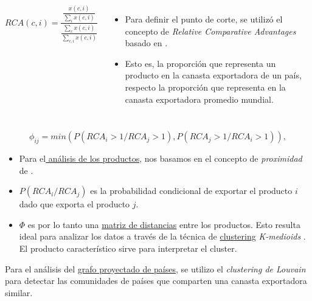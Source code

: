 \documentclass[compress]{beamer}
\begin{document}
\begin{frame}

\begin{columns}[c] 

$$
RCA(c,i)= \frac{\displaystyle \frac{x(c,i)}{\displaystyle \sum_{i}x(c,i)}}{\frac{\displaystyle\sum_{c}x(c,i)}{\displaystyle \sum_{c,i}x(c,i)}}
$$	

\small{
\begin{itemize}[label=\faRebel]
\item Para definir el punto de corte, se utilizó el concepto de \textit{Relative Comparative Advantages} basado en 	\cite{Hidalgo2009}.
\item Esto es, la proporción que representa un producto en la canasta exportadora de un país, respecto la proporción que representa en la canasta exportadora promedio mundial.
\end{itemize}
}
\end{columns}

\end{frame}


\begin{frame}

$$
\phi_{ij} = min (P(RCA_i>1/RCA_j>1),P(RCA_j>1/RCA_i>1)),
$$
\small

\begin{itemize}[label=\faRebel]
\item Para el\underline{ análisis de los productos}, nos basamos en el concepto de \textit{proximidad} de \cite{Hidalgo2009}.
\item $P(RCA_i/RCA_j)$ es la probabilidad condicional de exportar el producto $i$ dado que exporta el producto $j$.
\item $\Phi$ es por lo tanto una \underline{matriz de distancias} entre los productos. Esto resulta ideal para analizar los datos a través de la técnica de \underline{clustering} \textit{K-medioids} \citep{kaufman1987clustering}. El producto característico sirve para interpretar el cluster.
\end{itemize}

\end{frame}

\begin{frame}
Para el análisis del \underline{grafo proyectado de países}, se utilizo el \textit{clustering de Louvain} \citep{blondel2008fast} para detectar las comunidades de países que comparten una canasta exportadora similar.
\end{frame}
\end{document}
